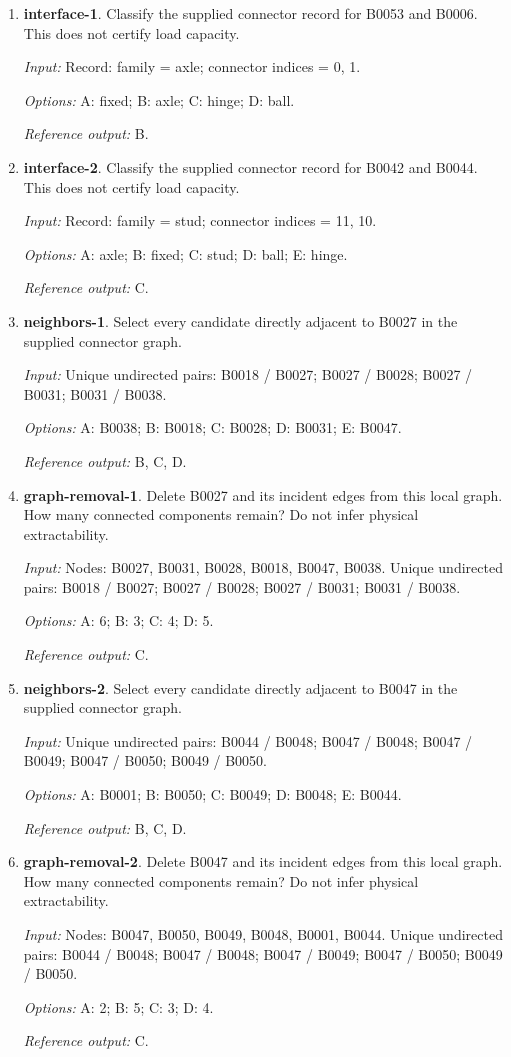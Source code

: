 \begin{enumerate}
\item \textbf{interface-1}. Classify the supplied connector record for B0053 and B0006. This does not certify load capacity.\par {\small \textit{Input:} Record: family = axle; connector indices = 0, 1. \par\textit{Options:} A: fixed; B: axle; C: hinge; D: ball. \par\textit{Reference output:} B.}
\item \textbf{interface-2}. Classify the supplied connector record for B0042 and B0044. This does not certify load capacity.\par {\small \textit{Input:} Record: family = stud; connector indices = 11, 10. \par\textit{Options:} A: axle; B: fixed; C: stud; D: ball; E: hinge. \par\textit{Reference output:} C.}
\item \textbf{neighbors-1}. Select every candidate directly adjacent to B0027 in the supplied connector graph.\par {\small \textit{Input:} Unique undirected pairs: B0018 / B0027; B0027 / B0028; B0027 / B0031; B0031 / B0038. \par\textit{Options:} A: B0038; B: B0018; C: B0028; D: B0031; E: B0047. \par\textit{Reference output:} B, C, D.}
\item \textbf{graph-removal-1}. Delete B0027 and its incident edges from this local graph. How many connected components remain? Do not infer physical extractability.\par {\small \textit{Input:} Nodes: B0027, B0031, B0028, B0018, B0047, B0038. Unique undirected pairs: B0018 / B0027; B0027 / B0028; B0027 / B0031; B0031 / B0038. \par\textit{Options:} A: 6; B: 3; C: 4; D: 5. \par\textit{Reference output:} C.}
\item \textbf{neighbors-2}. Select every candidate directly adjacent to B0047 in the supplied connector graph.\par {\small \textit{Input:} Unique undirected pairs: B0044 / B0048; B0047 / B0048; B0047 / B0049; B0047 / B0050; B0049 / B0050. \par\textit{Options:} A: B0001; B: B0050; C: B0049; D: B0048; E: B0044. \par\textit{Reference output:} B, C, D.}
\item \textbf{graph-removal-2}. Delete B0047 and its incident edges from this local graph. How many connected components remain? Do not infer physical extractability.\par {\small \textit{Input:} Nodes: B0047, B0050, B0049, B0048, B0001, B0044. Unique undirected pairs: B0044 / B0048; B0047 / B0048; B0047 / B0049; B0047 / B0050; B0049 / B0050. \par\textit{Options:} A: 2; B: 5; C: 3; D: 4. \par\textit{Reference output:} C.}

\end{enumerate}
